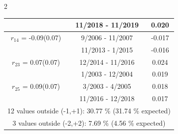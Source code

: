 \begin{multicols}{2}
{\begin{tabular}{ccc}
&       11/2018 - 11/2019 &        0.020  \vspace{-.02in} \\ \hline 
  $r_{14}$ = -0.09(0.07) &       9/2006 - 11/2007 &       -0.017    \vspace{-.10in} \\ 
  &       11/2013 -  1/2015 &       -0.016  \vspace{-.02in}   \\ \hline 
    $r_{23}$ = 0.07(0.07) &      12/2014 - 11/2016 &        0.024   \vspace{-.10in} \\  
&        1/2003 - 12/2004 &        0.019  \vspace{-.02in} \\ \hline 
  $r_{25}$ = 0.09(0.07) &       3/2003 -  4/2005 &        0.018   \vspace{-.10in} \\  
&       11/2016 - 12/2018 &        0.017  \vspace{-.02in} \\ \hline 
\multicolumn{3}{c}{              12 values outside (-1,+1): 30.77  \% (31.74  \% expected)}\vspace{-.10in} \\ 
\multicolumn{3}{c}{               3 values outside (-2,+2):  7.69 \%  (4.56 \% expected) } \\
 \end{tabular} \\ 
 } 
\end{multicols} 
